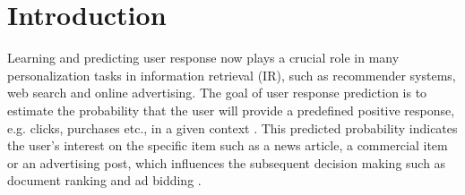 \documentclass[conference]{IEEEtran}
\begin{document}


\IEEEpeerreviewmaketitle


\section{Introduction}\label{sec:intro}
Learning and predicting user response now plays a crucial role in many personalization tasks in information retrieval (IR), such as recommender systems, web search and online advertising. The goal of user response prediction is to estimate the probability that the user will provide a predefined positive response, e.g. clicks, purchases etc., in a given context
\cite{menon2011response}.
This predicted probability indicates the user's interest on the specific item such as a news article, a commercial item or an advertising post, which influences the subsequent decision making such as document ranking \cite{xue2004optimizing} and ad bidding \cite{zhang2014optimal}.

\end{document}
